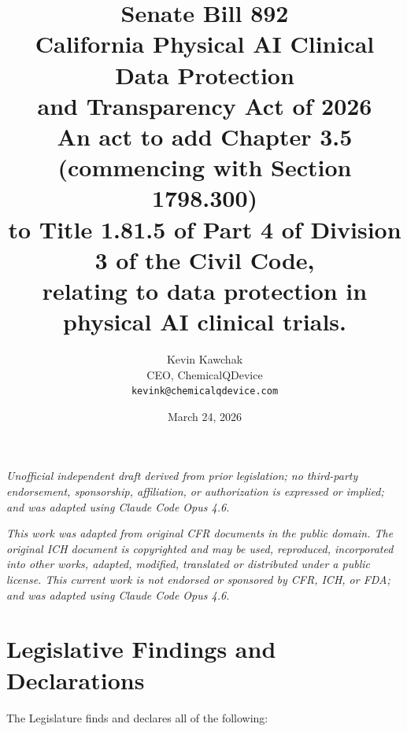 \documentclass[11pt,letterpaper]{article}
\title{%
  \textbf{Senate Bill 892}\\[6pt]
  \large California Physical AI Clinical Data Protection\\
  and Transparency Act of 2026\\[6pt]
  \normalsize An act to add Chapter 3.5 (commencing with Section 1798.300)\\
  to Title 1.81.5 of Part 4 of Division 3 of the Civil Code,\\
  relating to data protection in physical AI clinical trials.
}
\author{%
  Kevin Kawchak\\
  CEO, ChemicalQDevice\\
  \texttt{kevink@chemicalqdevice.com}
}
\date{March 24, 2026}
\begin{document}
\maketitle
\thispagestyle{fancy}

\begin{center}
\footnotesize
\textit{Unofficial independent draft derived from prior legislation;
no third-party endorsement, sponsorship, affiliation, or authorization
is expressed or implied; and was adapted using Claude Code Opus 4.6.}
\end{center}

\vspace{0.5em}

\begin{center}
\footnotesize
\textit{This work was adapted from original CFR documents in the public domain.
The original ICH document is copyrighted and may be used, reproduced,
incorporated into other works, adapted, modified, translated or distributed
under a public license. This current work is not endorsed or sponsored by
CFR, ICH, or FDA; and was adapted using Claude Code Opus 4.6.}
\end{center}

\vspace{1em}
\tableofcontents
\newpage

\section{Legislative Findings and Declarations}

The Legislature finds and declares all of the following:
\end{document}
